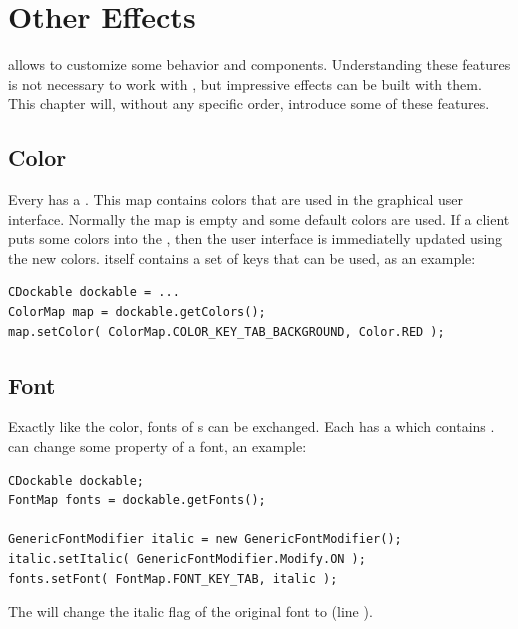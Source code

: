  \section{Other Effects}
 allows to customize some behavior and components. Understanding these features is not necessary to work with , but impressive effects can be built with them. This chapter will, without any specific order, introduce some of these features.

\subsection{Color}
Every  has a . This map contains colors that are used in the graphical user interface. Normally the map is empty and some default colors are used. If a client puts some colors into the , then the user interface is immediatelly updated using the new colors.  itself contains a set of keys that can be used, as an example:
\begin{lstlisting}
CDockable dockable = ...
ColorMap map = dockable.getColors();
map.setColor( ColorMap.COLOR_KEY_TAB_BACKGROUND, Color.RED );
\end{lstlisting}



\subsection{Font}
Exactly like the color, fonts of s can be exchanged. Each  has a  which contains .  can change some property of a font, an example:
\begin{lstlisting}
CDockable dockable;
FontMap fonts = dockable.getFonts();

GenericFontModifier italic = new GenericFontModifier();
italic.setItalic( GenericFontModifier.Modify.ON );
fonts.setFont( FontMap.FONT_KEY_TAB, italic );
\end{lstlisting}
The   will change the italic flag of the original font to  (line ).

